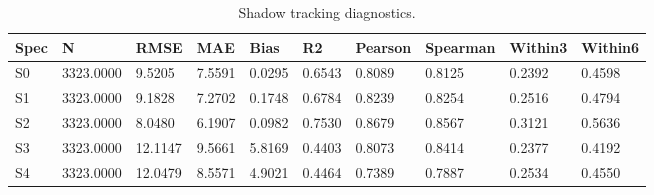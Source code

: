 \begin{table}

\caption{\label{tab:tab:shadow_tracking}Shadow tracking diagnostics.}
\centering
\begin{tabular}[t]{llllllllll}
\toprule
Spec & N & RMSE & MAE & Bias & R2 & Pearson & Spearman & Within3 & Within6\\
\midrule
S0 & 3323.0000 & 9.5205 & 7.5591 & 0.0295 & 0.6543 & 0.8089 & 0.8125 & 0.2392 & 0.4598\\
S1 & 3323.0000 & 9.1828 & 7.2702 & 0.1748 & 0.6784 & 0.8239 & 0.8254 & 0.2516 & 0.4794\\
S2 & 3323.0000 & 8.0480 & 6.1907 & 0.0982 & 0.7530 & 0.8679 & 0.8567 & 0.3121 & 0.5636\\
S3 & 3323.0000 & 12.1147 & 9.5661 & 5.8169 & 0.4403 & 0.8073 & 0.8414 & 0.2377 & 0.4192\\
S4 & 3323.0000 & 12.0479 & 8.5571 & 4.9021 & 0.4464 & 0.7389 & 0.7887 & 0.2534 & 0.4550\\
\bottomrule
\end{tabular}
\end{table}
